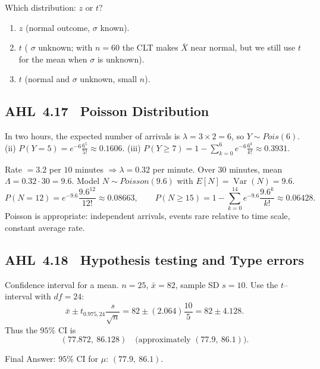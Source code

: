 \documentclass[11pt]{article}
\def\textbf#1{#1}%
\def\mathrm#1{#1}%
\newcommand{\tocsubsection}[1]{\subsection{#1}}
\begin{document}
\begin{solution}
\textbf{Which distribution: $z$ or $t$?}

\begin{enumerate}
  \item $z$ (normal outcome, $\sigma$ known).
  \item $t$ ( $\sigma$ unknown; with $n=60$ the CLT makes $\bar X$ near normal, but we still use $t$ for the mean when $\sigma$ is unknown).
  \item $t$ (normal and $\sigma$ unknown, small $n$).
\end{enumerate}
\end{solution}



\tocsubsection{AHL 4.17 \; Poisson Distribution}

\begin{solution}
In two hours, the expected number of arrivals is $\lambda=3\times2=6$, so
$Y\sim\mathrm{Pois}(6)$.  (ii) $P(Y=5)=e^{-6}\tfrac{6^5}{5!}\approx0.1606$.
(iii) $P(Y\ge7)=1-\sum_{k=0}^6 e^{-6}\tfrac{6^k}{k!}\approx0.3931$.
\end{solution}

\begin{solution}
Rate $=3.2$ per $10$ minutes $\Rightarrow \lambda=0.32$ per minute. Over $30$ minutes, mean $\Lambda=0.32\cdot 30=9.6$. Model $N\sim\mathrm{Poisson}(9.6)$ with $E[N]=\operatorname{Var}(N)=9.6$.
\[
P(N=12)=e^{-9.6}\frac{9.6^{12}}{12!}\approx 0.08663,\qquad
P(N\ge 15)=1-\sum_{k=0}^{14}e^{-9.6}\frac{9.6^k}{k!}\approx 0.06428.
\]
Poisson is appropriate: independent arrivals, events rare relative to time scale, constant average rate.
\end{solution}

\tocsubsection{AHL 4.18 \; Hypothesis testing and Type errors}


\begin{solution}
\textbf{Confidence interval for a mean.}  $n=25$, $\bar x=82$, sample SD $s=10$.  
Use the $t$–interval with $df=24$:
\[
\bar x \pm t_{0.975,24}\frac{s}{\sqrt{n}}
=82 \pm (2.064)\frac{10}{5}
=82 \pm 4.128.
\]
Thus the $95\%$ CI is
\[
\boxed{(77.872,\ 86.128)} \quad \text{(approximately }(77.9,\ 86.1)\text{)}.
\]

\textbf{Final Answer:} $95\%$ CI for $\mu$: $(77.9,\ 86.1)$.
\end{solution}
\end{document}
